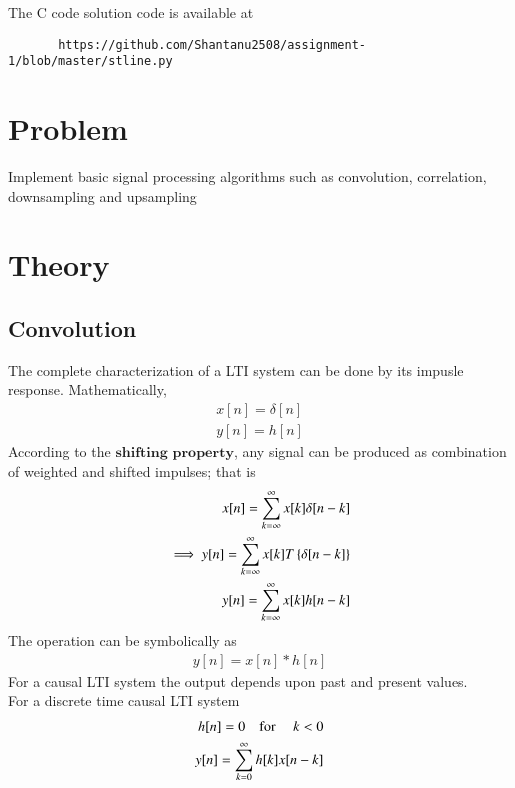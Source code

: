 \documentclass[journal,12pt,twocolumn]{IEEEtran}
\begin{document}
The C code solution code is available at
\begin{lstlisting}
       https://github.com/Shantanu2508/assignment-1/blob/master/stline.py
\end{lstlisting}
%
%
\section{Problem}
Implement basic signal processing algorithms such as convolution, correlation, downsampling and upsampling
\section{Theory}
\subsection{Convolution}
The complete characterization of a LTI system can be done by its impusle response. Mathematically,
\begin{align*}
	x[n]=\delta[n] \\ 
	y[n]=h[n]
\end{align*}
According to the $\mathbf{shifting}$ $\mathbf{property}$, any signal can be produced as combination of weighted and shifted impulses; that is
\begin{align*}
	x[n]=\sum\limits_{k=\infty}^{\infty} x[k]\delta[n-k] \\
	\implies 
	y[n]=\sum\limits_{k=\infty}^{\infty} x[k] T\left\{\delta[n-k]\right\} \\
	y[n]=\sum\limits_{k=\infty}^{\infty} x[k] h[n-k] \\
\end{align*}
The operation can be symbolically as 
\begin{align*}
	y[n]=x[n]*h[n]
\end{align*}
For a causal LTI system the output depends upon past and present values. \\
For a discrete time causal LTI system 
\begin{align*}
	h[n]=0 \text{\quad for \quad} k<0 \\
	y[n]=\sum\limits_{k=0}^{\infty} h[k] x[n-k] \\
\end{align*}
\end{document}
